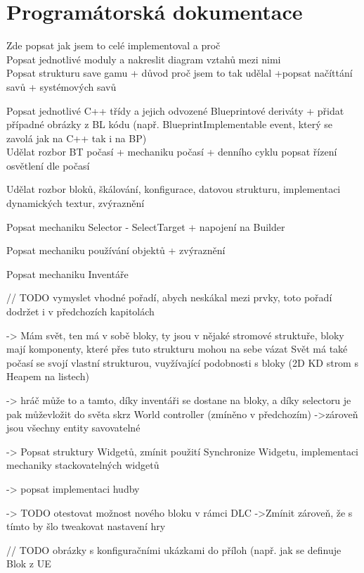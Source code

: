 
\chapter{Programátorská dokumentace}

Zde popsat jak jsem to celé implementoval a proč\\

Popsat jednotlivé moduly a nakreslit diagram vztahů mezi nimi\\

Popsat strukturu save gamu + důvod proč jsem to tak udělal
+popsat načíttání savů + systémových savů


Popsat jednotlivé C++ třídy a jejich odvozené Blueprintové deriváty + přidat případné obrázky z BL kódu (např. BlueprintImplementable event, který se zavolá jak na C++ tak i na BP) \\

Udělat rozbor BT počasí + mechaniku počasí + denního cyklu
popsat řízení osvětlení dle počasí

Udělat rozbor bloků, škálování, konfigurace, datovou strukturu, implementaci dynamických textur, zvýraznění

Popsat mechaniku Selector - SelectTarget + napojení na Builder

Popsat mechaniku používání objektů + zvýraznění

Popsat mechaniku Inventáře

// TODO vymyslet vhodné pořadí, abych neskákal mezi prvky, toto pořadí dodržet i v předchozích kapitolách

-> Mám svět, ten má v sobě bloky, ty jsou v nějaké stromové struktuře, bloky mají komponenty, které přes tuto strukturu mohou na sebe vázat
Svět má také počasí se svojí vlastní strukturou, vuyžívající podobnosti s bloky (2D KD strom s Heapem na listech)

-> hráč může to a tamto, díky inventáři se dostane na bloky, a díky selectoru je pak můževložit do světa skrz World controller (zmíněno v předchozím)
->zároveň jsou všechny entity savovatelné 


-> Popsat struktury Widgetů, zmínit použití Synchronize Widgetu, implementaci mechaniky stackovatelných widgetů

-> popsat implementaci hudby

-> TODO otestovat možnost nového bloku v rámci DLC
->Zmínit zároveň, že s tímto by šlo tweakovat nastavení hry



// TODO obrázky s konfiguračními ukázkami do příloh (např. jak se definuje Blok z UE



